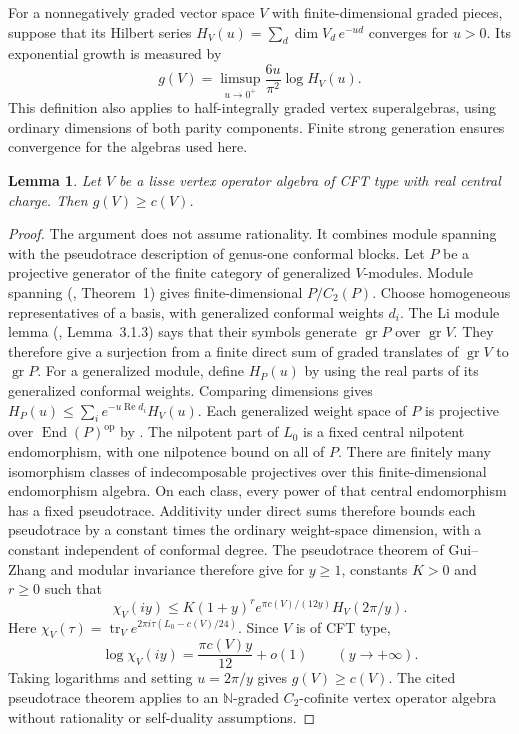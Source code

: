 \documentclass[11pt,a4paper]{amsart}
\numberwithin{equation}{section}
\newtheorem{lemma}[theorem]{Lemma}
\theoremstyle{definition}
\theoremstyle{remark}
\begin{document}
For a nonnegatively graded vector space $V$ with finite-dimensional
graded pieces, suppose that its Hilbert series
$H_V(u)=\sum_d\dim V_d\,e^{-ud}$ converges for $u>0$. Its exponential
growth is measured by
$$
 g(V)=\limsup_{u\to0^+}\frac{6u}{\pi^2}\log H_V(u).
$$
This definition also applies to half-integrally graded vertex
superalgebras, using ordinary dimensions of both parity components.
Finite strong generation ensures convergence for the algebras used here.

\begin{lemma}\label{seed:modular-growth-lower-bound}
Let $V$ be a lisse vertex operator algebra of CFT type with real central
charge. Then $g(V)\ge c(V)$.
\end{lemma}
\begin{proof}
The argument does not assume rationality. It combines
module spanning with the pseudotrace description of genus-one
conformal blocks. Let $P$ be a projective generator of the finite category of
generalized $V$-modules. Module spanning (\cite{Buhl2002}, Theorem~1)
gives finite-dimensional $P/C_2(P)$. Choose homogeneous representatives
of a basis, with generalized conformal weights $d_i$. The Li module
lemma (\cite{Arakawa2012}, Lemma~3.1.3) says that their symbols generate
$\operatorname{gr}P$ over $\operatorname{gr}V$. They therefore give a
surjection from a finite direct sum of graded translates of
$\operatorname{gr}V$ to $\operatorname{gr}P$.
For a generalized module, define $H_P(u)$ by using the real parts of
its generalized conformal weights. Comparing dimensions gives
$H_P(u)\le\sum_i e^{-u\operatorname{Re}d_i}H_V(u)$.
Each generalized weight space of $P$ is projective over
$\operatorname{End}(P)^{\mathrm{op}}$ by \cite[Section~3.2.1]{GuiZhang}. The nilpotent part of $L_0$
is a fixed central nilpotent endomorphism, with one nilpotence bound
on all of $P$. There are finitely many isomorphism classes of
indecomposable projectives over this finite-dimensional endomorphism
algebra. On each class, every power of that central endomorphism has
a fixed pseudotrace. Additivity under direct sums therefore bounds
each pseudotrace by a constant times the ordinary weight-space
dimension, with a constant independent of conformal degree. The pseudotrace theorem of Gui--Zhang \cite[Theorem~3.7]{GuiZhang} and modular invariance \cite[Theorem~5.2]{Miyamoto2004} therefore give  for $y\ge1$, constants $K>0$ and $r\ge0$ such that
$$
 \chi_V(iy)\le K(1+y)^r e^{\pi c(V)/(12y)}H_V(2\pi/y).
$$
Here $\chi_V(\tau)=\operatorname{tr}_V
 e^{2\pi i\tau(L_0-c(V)/24)}$. Since $V$ is of CFT type,
$$
 \log\chi_V(iy)=\frac{\pi c(V)y}{12}+o(1)
 \qquad(y\to+\infty).
$$
Taking logarithms and setting $u=2\pi/y$ gives $g(V)\ge c(V)$.
The cited pseudotrace theorem applies to an $\mathbb N$-graded $C_2$-cofinite vertex operator algebra without rationality or self-duality assumptions.

\end{proof}
\end{document}
